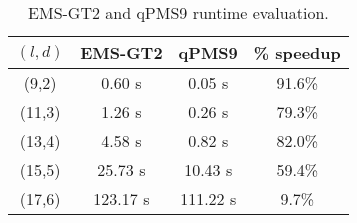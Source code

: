 \begin{table}[h] %
	\renewcommand{\arraystretch}{1.3}
	\caption{EMS-GT2 and qPMS9 runtime evaluation.}
	\label{tbl:final-results}
	\centering
	\begin{tabular}{|c|c|c|c|}
	\hline 
	\bfseries\boldmath $(l,d)$ & 
	\bfseries EMS-GT2 & 
	\bfseries\boldmath qPMS9 & 
	\bfseries \% speedup\\
	\hline
	 (9,2) &   0.60 s &    0.05 s &   91.6\%\\
	(11,3) &   1.26 s &    0.26 s &   79.3\%\\
	(13,4) &   4.58 s &    0.82 s &   82.0\%\\
	(15,5) &  25.73 s &   10.43 s &   59.4\%\\
	(17,6) & 123.17 s &  111.22 s &   9.7\%\\
	\hline\end{tabular}
\end{table}


